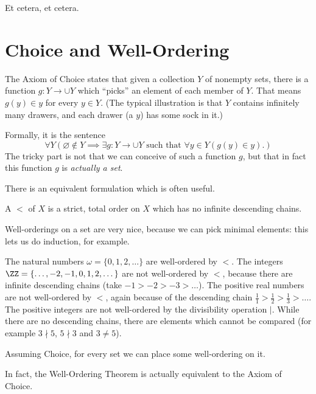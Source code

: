 Et cetera, et cetera.

\section{Choice and Well-Ordering}
The Axiom of Choice states that given a collection $Y$ of nonempty sets,
there is a function $g : Y \to \cup Y$ which ``picks'' an element of each member of $Y$.
That means $g(y) \in y$ for every $y \in Y$.
(The typical illustration is that $Y$ contains infinitely many drawers,
and each drawer (a $y$) has some sock in it.)

Formally, it is the sentence
\[ \forall Y \left(\varnothing \notin Y
	\implies 
	\exists g : Y \to \cup Y
	\text{ such that }
	\forall y \in Y \left( g(y) \in y \right).
	\right)
\]
The tricky part is not that we can conceive of such a function $g$,
but that in fact this function $g$ is \emph{actually a set}.

There is an equivalent formulation which is often useful.
\begin{definition}
	A  $<$ of $X$ is a strict, total order on $X$
	which has no infinite descending chains.
\end{definition}
Well-orderings on a set are very nice, because we can pick minimal elements:
this lets us do induction, for example.
\begin{example}
	\listhack
	\begin{enumerate}[(a)]
		\ii The natural numbers $\omega = \{0,1,2,\dots\}$
		are well-ordered by $<$.
		\ii The integers $\ZZ = \{\dots,-2,-1,0,1,2,\dots\}$ are not well-ordered by $<$,
		because there are infinite descending chains (take $-1 > -2 > -3 > \dots$).
		\ii The positive real numbers are not well-ordered by $<$,
		again because of the descending chain $\frac11>\frac12>\frac13>\dots$.
		\ii The positive integers are not well-ordered by the divisibility operation $\mid$.
		While there are no descending chains, there are elements which cannot be compared
		(for example $3 \nmid 5$, $5 \nmid 3$ and $3 \neq 5$).
	\end{enumerate}
\end{example}

\begin{theorem}
	Assuming Choice, for every set we can place some well-ordering on it.
\end{theorem}
In fact, the Well-Ordering Theorem is actually equivalent to the Axiom of Choice.

